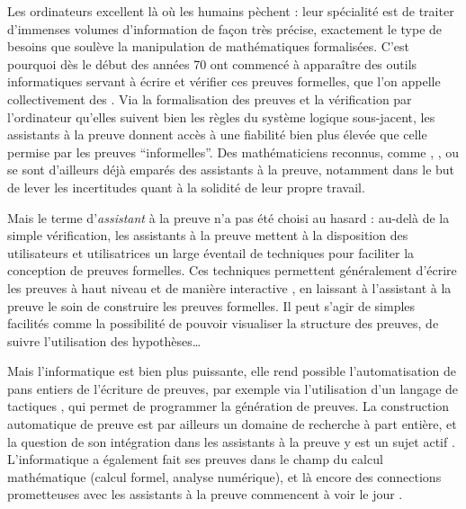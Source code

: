 Les ordinateurs excellent là où les humains pèchent : leur spécialité est de traiter
d’immenses volumes d’information de façon très précise, exactement le type
de besoins que soulève la manipulation de mathématiques formalisées. C’est pourquoi dès
le début des années 70%
%
%
ont commencé à apparaître des outils informatiques servant à écrire et vérifier ces
preuves formelles, que l’on appelle collectivement des .
Via la formalisation des preuves et la vérification par l’ordinateur qu’elles
suivent bien les règles du système logique sous-jacent, les assistants à la preuve
donnent accès à une fiabilité bien plus élevée que celle permise par les preuves
“informelles”.
Des mathématiciens reconnus, comme ,
, ou 
se sont d’ailleurs déjà emparés des assistants à la preuve,
notamment dans le but de lever les incertitudes
quant à la solidité de leur propre travail.

Mais le terme d’\emph{assistant} à la preuve n’a pas été choisi au hasard : au-delà
de la simple vérification, les assistants à la preuve mettent à la disposition des
utilisateurs et utilisatrices un large éventail de techniques pour
faciliter la conception de preuves formelles.
Ces techniques permettent généralement d’écrire
les preuves à haut niveau et de manière interactive%
, en laissant à l’assistant à la preuve le soin de construire les preuves formelles.
Il peut s’agir de simples facilités
comme la possibilité de pouvoir visualiser la structure des
preuves, de suivre l’utilisation des hypothèses…

Mais l’informatique est bien plus puissante, elle rend possible
l’automatisation de pans entiers de l’écriture de preuves,
par exemple via l’utilisation d’un langage de tactiques ,
qui permet de programmer la génération de preuves.
La construction automatique de preuve est par ailleurs un domaine de recherche à part entière,
et la question de son intégration dans les assistants à la
preuve y est un sujet actif .
L’informatique a également fait ses preuves dans le champ du calcul mathématique
(calcul formel, analyse numérique), et là encore des connections prometteuses
avec les assistants à la preuve commencent à voir le jour .

